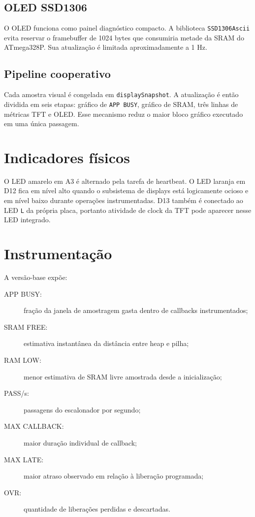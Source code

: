 \documentclass[12pt,a4paper]{article}
\begin{document}
\subsection{OLED SSD1306}

O OLED funciona como painel diagnóstico compacto. A biblioteca
\texttt{SSD1306Ascii} evita reservar o framebuffer de 1024 bytes que consumiria
metade da SRAM do ATmega328P. Sua atualização é limitada aproximadamente a 1 Hz.

\subsection{Pipeline cooperativo}

Cada amostra visual é congelada em \texttt{displaySnapshot}. A atualização é
então dividida em seis etapas: gráfico de \texttt{APP BUSY}, gráfico de SRAM,
três linhas de métricas TFT e OLED. Esse mecanismo reduz o maior bloco gráfico
executado em uma única passagem.

\section{Indicadores físicos}

O LED amarelo em A3 é alternado pela tarefa de heartbeat. O LED laranja em D12
fica em nível alto quando o subsistema de displays está logicamente ocioso e em
nível baixo durante operações instrumentadas. D13 também é conectado ao LED
\texttt{L} da própria placa, portanto atividade de clock da TFT pode aparecer
nesse LED integrado.

\section{Instrumentação}

A versão-base expõe:

\begin{description}
  \item[APP BUSY:] fração da janela de amostragem gasta dentro de callbacks instrumentados;
  \item[SRAM FREE:] estimativa instantânea da distância entre heap e pilha;
  \item[RAM LOW:] menor estimativa de SRAM livre amostrada desde a inicialização;
  \item[PASS/s:] passagens do escalonador por segundo;
  \item[MAX CALLBACK:] maior duração individual de callback;
  \item[MAX LATE:] maior atraso observado em relação à liberação programada;
  \item[OVR:] quantidade de liberações perdidas e descartadas.
\end{description}
\end{document}
